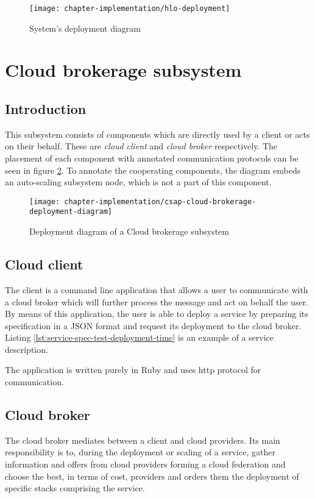 \begin{figure}[!ht]
  \begin{center}
    \texttt{[image: chapter-implementation/hlo-deployment]}
  \end{center}
  \caption{System's deployment diagram}
  \label{fig:hlo-deployment}
\end{figure}

\section{Cloud brokerage subsystem}
\subsection{Introduction}
This subsystem consists of components which are directly used by a client or acts on their behalf. These are \emph{cloud client} and \emph{cloud broker} respectively. The placement of each component with annotated communication protocols can be seen in figure \ref{fig:csap-cloud-brokerage-deployment-diagram}. To annotate the cooperating components, the diagram embeds an auto-scaling subsystem node, which is not a part of this component.

\begin{figure}[!ht]
  \begin{center}
    \texttt{[image: chapter-implementation/csap-cloud-brokerage-deployment-diagram]}
  \end{center}
  \caption{Deployment diagram of a Cloud brokerage subsystem}
  \label{fig:csap-cloud-brokerage-deployment-diagram}
\end{figure}

\subsection{Cloud client}
The client is a command line application that allows a user to communicate with a cloud broker which will further process the message and act on behalf the user. By means of this application, the user is able to deploy a service by preparing its specification in a JSON format and request its deployment to the cloud broker. Listing \ref{lst:service-spec-test-deployment-time} is an example of a service description.

The application is written purely in Ruby and uses http protocol for communication. 

\subsection{Cloud broker}
The cloud broker mediates between a client and cloud providers. Its main responsibility is to, during the deployment or scaling of a service, gather information and offers from cloud providers forming a cloud federation and choose the best, in terms of cost, providers and orders them the deployment of specific stacks comprising the service.

